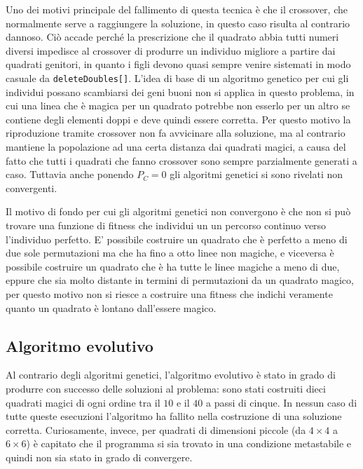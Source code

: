 \documentclass[italian,twoside,twocolumn]{article}
\begin{document}
Uno dei motivi principale del fallimento di questa tecnica è che il crossover, che normalmente serve a raggiungere la soluzione, in questo caso risulta al contrario dannoso. Ciò accade perché la prescrizione che il quadrato abbia tutti numeri diversi impedisce al crossover di produrre un individuo migliore a partire dai quadrati genitori, in quanto i figli devono quasi sempre venire sistemati in modo casuale da \texttt{deleteDoubles[]}. 
L'idea di base di un algoritmo genetico per cui gli individui possano scambiarsi dei geni buoni non si applica in questo problema, in cui una linea che è magica per un quadrato potrebbe non esserlo per un altro se contiene degli elementi doppi e deve quindi essere corretta. Per questo motivo la riproduzione tramite crossover non fa avvicinare alla soluzione, ma al contrario mantiene la popolazione ad una certa distanza dai quadrati magici, a causa del fatto che tutti i quadrati che fanno crossover sono sempre parzialmente generati a caso. Tuttavia anche ponendo $ P_C = 0 $ gli algoritmi genetici si sono rivelati non convergenti. 

Il motivo di fondo per cui gli algoritmi genetici non convergono è che non si può trovare una funzione di fitness che individui un un percorso continuo verso l'individuo perfetto. E' possibile costruire un quadrato che è perfetto a meno di due sole permutazioni ma che ha fino a otto linee non magiche, e viceversa è possibile costruire un quadrato che è ha tutte le linee magiche a meno di due, eppure che sia molto distante in termini di permutazioni da un quadrato magico, per questo motivo non si riesce a costruire una fitness che indichi veramente quanto un quadrato è lontano dall'essere magico.	

\subsection{Algoritmo evolutivo}
Al contrario degli algoritmi genetici, l'algoritmo evolutivo è stato in grado di produrre con successo delle soluzioni al problema: sono stati costruiti dieci quadrati magici di ogni ordine tra il $ 10 $ e il $ 40 $ a passi di cinque. In nessun caso di tutte queste esecuzioni l'algoritmo ha fallito nella costruzione di una soluzione corretta. Curiosamente, invece, per quadrati di dimensioni piccole (da $ 4\times 4 $ a $ 6\times6 $) è capitato che il programma si sia trovato in una condizione metastabile e quindi non sia stato in grado di convergere. 
\end{document}
